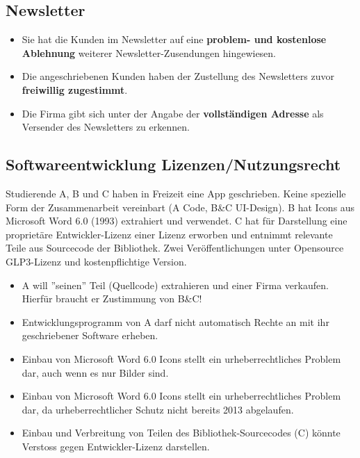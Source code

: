 \subsection{Newsletter}
\begin{itemize}
	\item Sie hat die Kunden im Newsletter auf eine \textbf{problem- und kostenlose Ablehnung} weiterer Newsletter-Zusendungen hingewiesen.
	\item Die angeschriebenen Kunden haben der Zustellung des Newsletters zuvor \textbf{freiwillig zugestimmt}.
	\item Die Firma gibt sich unter der Angabe der \textbf{vollständigen Adresse} als Versender des Newsletters zu erkennen.
\end{itemize}

\subsection{Softwareentwicklung Lizenzen/Nutzungsrecht}
Studierende A, B und C haben in Freizeit eine App geschrieben. Keine spezielle Form der Zusammenarbeit vereinbart (A Code, B\&C UI-Design). B hat Icons aus Microsoft Word 6.0 (1993) extrahiert und verwendet. C hat für Darstellung eine proprietäre Entwickler-Lizenz einer Lizenz erworben und entnimmt relevante Teile aus Sourcecode der Bibliothek. Zwei Veröffentlichungen unter Opensource GLP3-Lizenz und kostenpflichtige Version.
\begin{itemize}
	\item A will ''seinen'' Teil (Quellcode) extrahieren und einer Firma verkaufen. Hierfür braucht er Zustimmung von B\&C!
	\item Entwicklungsprogramm von A darf nicht automatisch Rechte an mit ihr geschriebener Software erheben.
	\item Einbau von Microsoft Word 6.0 Icons stellt ein urheberrechtliches Problem dar, auch wenn es nur Bilder sind.
	\item Einbau von Microsoft Word 6.0 Icons stellt ein urheberrechtliches Problem dar, da urheberrechtlicher Schutz nicht bereits 2013 abgelaufen.
	\item Einbau und Verbreitung von Teilen des Bibliothek-Sourcecodes (C) könnte Verstoss gegen Entwickler-Lizenz darstellen.
\end{itemize}